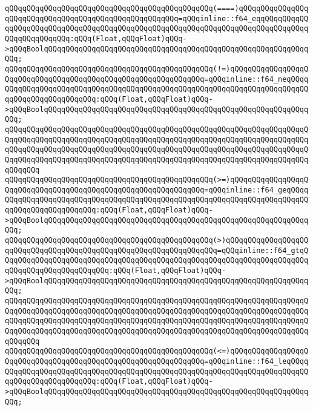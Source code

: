 \verb|qQQqqQQqqQQqqQQqqQQqqQQqqQQqqQQqqQQqqQQqqQQqqQQq(====)qQQqqQQqqQQqqQQqqQQqqQQqqQQqqQQqqQQqqQQqqQQqqQQqqQQqqQQq=qQQqinline::f64_eqqQQqqQQqqQQqqQQqqQQqqQQqqQQqqQQqqQQqqQQqqQQqqQQqqQQqqQQqqQQqqQQqqQQqqQQqqQQqqQQqqQQqqQQqqQQqqQQq:qQQq(Float,qQQqFloat)qQQq->qQQqBoolqQQqqQQqqQQqqQQqqQQqqQQqqQQqqQQqqQQqqQQqqQQqqQQqqQQqqQQqqQQqqQQq;|\newline
\verb|qQQqqQQqqQQqqQQqqQQqqQQqqQQqqQQqqQQqqQQqqQQqqQQq(!=)qQQqqQQqqQQqqQQqqQQqqQQqqQQqqQQqqQQqqQQqqQQqqQQqqQQqqQQqqQQqqQQq=qQQqinline::f64_neqQQqqQQqqQQqqQQqqQQqqQQqqQQqqQQqqQQqqQQqqQQqqQQqqQQqqQQqqQQqqQQqqQQqqQQqqQQqqQQqqQQqqQQqqQQqqQQq:qQQq(Float,qQQqFloat)qQQq->qQQqBoolqQQqqQQqqQQqqQQqqQQqqQQqqQQqqQQqqQQqqQQqqQQqqQQqqQQqqQQqqQQqqQQq;|\newline
\verb|qQQqqQQqqQQqqQQqqQQqqQQqqQQqqQQqqQQqqQQqqQQqqQQqqQQqqQQqqQQqqQQqqQQqqQQqqQQqqQQqqQQqqQQqqQQqqQQqqQQqqQQqqQQqqQQqqQQqqQQqqQQqqQQqqQQqqQQqqQQqqQQqqQQqqQQqqQQqqQQqqQQqqQQqqQQqqQQqqQQqqQQqqQQqqQQqqQQqqQQqqQQqqQQqqQQqqQQqqQQqqQQqqQQqqQQqqQQqqQQqqQQqqQQqqQQqqQQqqQQqqQQqqQQqqQQqqQQqqQQqqQQqqQQq|\newline
\verb|qQQqqQQqqQQqqQQqqQQqqQQqqQQqqQQqqQQqqQQqqQQqqQQq(>=)qQQqqQQqqQQqqQQqqQQqqQQqqQQqqQQqqQQqqQQqqQQqqQQqqQQqqQQqqQQqqQQq=qQQqinline::f64_geqQQqqQQqqQQqqQQqqQQqqQQqqQQqqQQqqQQqqQQqqQQqqQQqqQQqqQQqqQQqqQQqqQQqqQQqqQQqqQQqqQQqqQQqqQQqqQQq:qQQq(Float,qQQqFloat)qQQq->qQQqBoolqQQqqQQqqQQqqQQqqQQqqQQqqQQqqQQqqQQqqQQqqQQqqQQqqQQqqQQqqQQqqQQq;|\newline
\verb|qQQqqQQqqQQqqQQqqQQqqQQqqQQqqQQqqQQqqQQqqQQqqQQq(>)qQQqqQQqqQQqqQQqqQQqqQQqqQQqqQQqqQQqqQQqqQQqqQQqqQQqqQQqqQQqqQQqqQQq=qQQqinline::f64_gtqQQqqQQqqQQqqQQqqQQqqQQqqQQqqQQqqQQqqQQqqQQqqQQqqQQqqQQqqQQqqQQqqQQqqQQqqQQqqQQqqQQqqQQqqQQqqQQq:qQQq(Float,qQQqFloat)qQQq->qQQqBoolqQQqqQQqqQQqqQQqqQQqqQQqqQQqqQQqqQQqqQQqqQQqqQQqqQQqqQQqqQQqqQQq;|\newline
\verb|qQQqqQQqqQQqqQQqqQQqqQQqqQQqqQQqqQQqqQQqqQQqqQQqqQQqqQQqqQQqqQQqqQQqqQQqqQQqqQQqqQQqqQQqqQQqqQQqqQQqqQQqqQQqqQQqqQQqqQQqqQQqqQQqqQQqqQQqqQQqqQQqqQQqqQQqqQQqqQQqqQQqqQQqqQQqqQQqqQQqqQQqqQQqqQQqqQQqqQQqqQQqqQQqqQQqqQQqqQQqqQQqqQQqqQQqqQQqqQQqqQQqqQQqqQQqqQQqqQQqqQQqqQQqqQQqqQQqqQQqqQQqqQQq|\newline
\verb|qQQqqQQqqQQqqQQqqQQqqQQqqQQqqQQqqQQqqQQqqQQqqQQq(<=)qQQqqQQqqQQqqQQqqQQqqQQqqQQqqQQqqQQqqQQqqQQqqQQqqQQqqQQqqQQqqQQq=qQQqinline::f64_leqQQqqQQqqQQqqQQqqQQqqQQqqQQqqQQqqQQqqQQqqQQqqQQqqQQqqQQqqQQqqQQqqQQqqQQqqQQqqQQqqQQqqQQqqQQqqQQq:qQQq(Float,qQQqFloat)qQQq->qQQqBoolqQQqqQQqqQQqqQQqqQQqqQQqqQQqqQQqqQQqqQQqqQQqqQQqqQQqqQQqqQQqqQQq;|\newline
